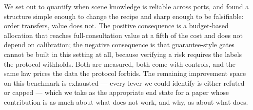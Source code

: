 \documentclass[journal]{IEEEtran}
\begin{document}
We set out to quantify when scene knowledge is reliable across ports, and found a structure simple
enough to change the recipe and sharp enough to be falsifiable: order transfers, value does not. The
positive consequence is a budget-based allocation that reaches full-consultation value at a fifth of
the cost and does not depend on calibration; the negative consequence is that guarantee-style gates
cannot be built in this setting at all, because verifying a risk requires the labels the protocol
withholds. Both are measured, both come with controls, and the same law prices the data the protocol
forbids. The remaining improvement space on this benchmark is exhausted --- every lever we could
identify is either refuted or capped --- which we take as the appropriate end state for a paper whose
contribution is as much about what does not work, and why, as about what does.



\end{document}
